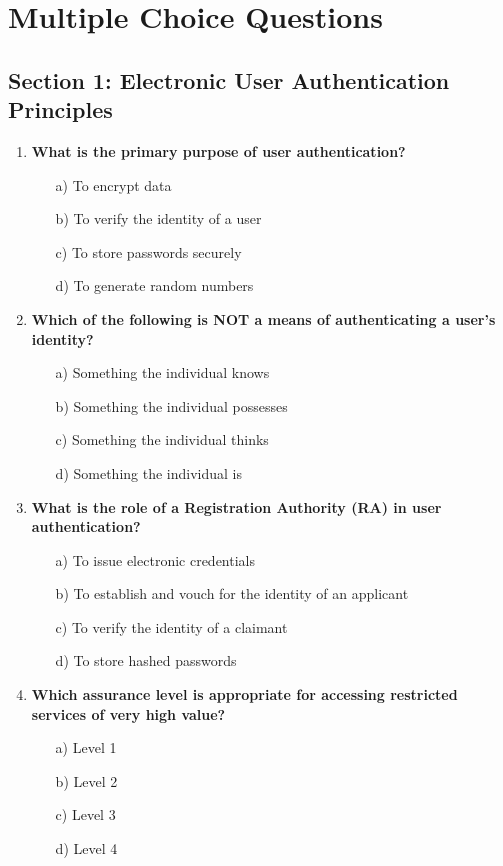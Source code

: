 \documentclass{article}
\begin{document}
\section*{Multiple Choice Questions}

\subsection*{Section 1: Electronic User Authentication Principles}
\begin{enumerate}
    \item \textbf{What is the primary purpose of user authentication?}
    \begin{itemize}
        \item[a)] To encrypt data  
        \item[b)] To verify the identity of a user  
        \item[c)] To store passwords securely  
        \item[d)] To generate random numbers  
    \end{itemize}

    \item \textbf{Which of the following is NOT a means of authenticating a user’s identity?}
    \begin{itemize}
        \item[a)] Something the individual knows  
        \item[b)] Something the individual possesses  
        \item[c)] Something the individual thinks  
        \item[d)] Something the individual is  
    \end{itemize}

    \item \textbf{What is the role of a Registration Authority (RA) in user authentication?}
    \begin{itemize}
        \item[a)] To issue electronic credentials  
        \item[b)] To establish and vouch for the identity of an applicant  
        \item[c)] To verify the identity of a claimant  
        \item[d)] To store hashed passwords  
    \end{itemize}

    \item \textbf{Which assurance level is appropriate for accessing restricted services of very high value?}
    \begin{itemize}
        \item[a)] Level 1  
        \item[b)] Level 2  
        \item[c)] Level 3  
        \item[d)] Level 4  
    \end{itemize}


\end{enumerate}
\end{document}
